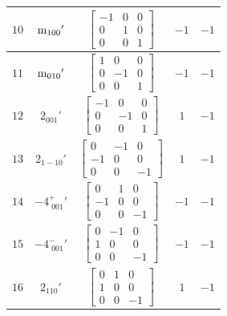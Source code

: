 \documentclass[fleqn,8pt]{jsarticle}
\begin{document}
\begin{longtable}{ccccc}
$ 10 $ & $ {\rm m}_{100}{}' $ & $ \begin{bmatrix} -1 & 0 & 0 \\ 0 & 1 & 0 \\ 0 & 0 & 1 \end{bmatrix} $ & $ -1 $ & $ -1 $ \\ \hline
$ 11 $ & $ {\rm m}_{010}{}' $ & $ \begin{bmatrix} 1 & 0 & 0 \\ 0 & -1 & 0 \\ 0 & 0 & 1 \end{bmatrix} $ & $ -1 $ & $ -1 $ \\ \hline
$ 12 $ & $ 2{}_{001}{}' $ & $ \begin{bmatrix} -1 & 0 & 0 \\ 0 & -1 & 0 \\ 0 & 0 & 1 \end{bmatrix} $ & $ 1 $ & $ -1 $ \\ \hline
$ 13 $ & $ 2{}_{1-10}{}' $ & $ \begin{bmatrix} 0 & -1 & 0 \\ -1 & 0 & 0 \\ 0 & 0 & -1 \end{bmatrix} $ & $ 1 $ & $ -1 $ \\ \hline
$ 14 $ & $ -4^{+}_{\,\,001}{}' $ & $ \begin{bmatrix} 0 & 1 & 0 \\ -1 & 0 & 0 \\ 0 & 0 & -1 \end{bmatrix} $ & $ -1 $ & $ -1 $ \\ \hline
$ 15 $ & $ -4^{-}_{\,\,001}{}' $ & $ \begin{bmatrix} 0 & -1 & 0 \\ 1 & 0 & 0 \\ 0 & 0 & -1 \end{bmatrix} $ & $ -1 $ & $ -1 $ \\ \hline
$ 16 $ & $ 2{}_{110}{}' $ & $ \begin{bmatrix} 0 & 1 & 0 \\ 1 & 0 & 0 \\ 0 & 0 & -1 \end{bmatrix} $ & $ 1 $ & $ -1 $ \\
\end{longtable}
\end{document}
